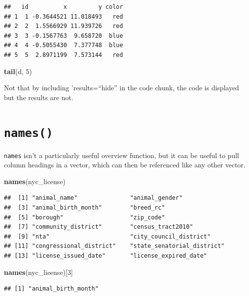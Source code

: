 \documentclass[
]{book}
\newenvironment{Shaded}{\begin{snugshade}}{\end{snugshade}}
\newcommand{\DecValTok}[1]{\textcolor[rgb]{0.00,0.00,0.81}{#1}}
\newcommand{\KeywordTok}[1]{\textcolor[rgb]{0.13,0.29,0.53}{\textbf{#1}}}
\newcommand{\NormalTok}[1]{#1}
\begin{document}
\begin{verbatim}
##   id          x         y color
## 1  1 -0.3644521 11.018493   red
## 2  2  1.5566929 11.939726   red
## 3  3 -0.1567763  9.658720  blue
## 4  4 -0.5055430  7.377748  blue
## 5  5  2.8971199  7.573144   red
\end{verbatim}

\begin{Shaded}
\begin{Highlighting}[]
\KeywordTok{tail}\NormalTok{(d, }\DecValTok{5}\NormalTok{)}
\end{Highlighting}
\end{Shaded}

Not that by including 'results=``hide'' in the code chunk, the code is displayed but the results are not.

\hypertarget{names}{%
\section{\texorpdfstring{\texttt{names()}}{names()}}\label{names}}

\texttt{names} isn't a particularly useful overview function, but it can be useful to
pull column headings in a vector, which can then be referenced like any other vector.

\begin{Shaded}
\begin{Highlighting}[]
\KeywordTok{names}\NormalTok{(nyc_license)}
\end{Highlighting}
\end{Shaded}

\begin{verbatim}
##  [1] "animal_name"               "animal_gender"            
##  [3] "animal_birth_month"        "breed_rc"                 
##  [5] "borough"                   "zip_code"                 
##  [7] "community_district"        "census_tract2010"         
##  [9] "nta"                       "city_council_district"    
## [11] "congressional_district"    "state_senatorial_district"
## [13] "license_issued_date"       "license_expired_date"
\end{verbatim}

\begin{Shaded}
\begin{Highlighting}[]
\KeywordTok{names}\NormalTok{(nyc_license)[}\DecValTok{3}\NormalTok{]}
\end{Highlighting}
\end{Shaded}

\begin{verbatim}
## [1] "animal_birth_month"
\end{verbatim}
\end{document}
